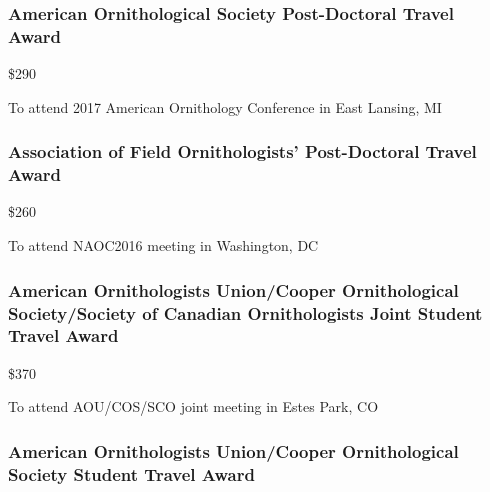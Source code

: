 \documentclass[
  letterpaper,
  DIV=11,
  numbers=noendperiod,
  oneside]{scrreprt}
\begin{document}
\subsubsection{American Ornithological Society Post-Doctoral Travel
Award}\label{american-ornithological-society-post-doctoral-travel-award}

\$290


To attend 2017 American Ornithology Conference in East Lansing, MI

\subsubsection{Association of Field Ornithologists' Post-Doctoral Travel
Award}\label{association-of-field-ornithologists-post-doctoral-travel-award}

\$260


To attend NAOC2016 meeting in Washington, DC

\subsubsection{American Ornithologists Union/Cooper Ornithological
Society/Society of Canadian Ornithologists Joint Student Travel
Award}\label{american-ornithologists-unioncooper-ornithological-societysociety-of-canadian-ornithologists-joint-student-travel-award}

\$370


To attend AOU/COS/SCO joint meeting in Estes Park, CO

\subsubsection{American Ornithologists Union/Cooper Ornithological
Society Student Travel
Award}\label{american-ornithologists-unioncooper-ornithological-society-student-travel-award}
\end{document}
